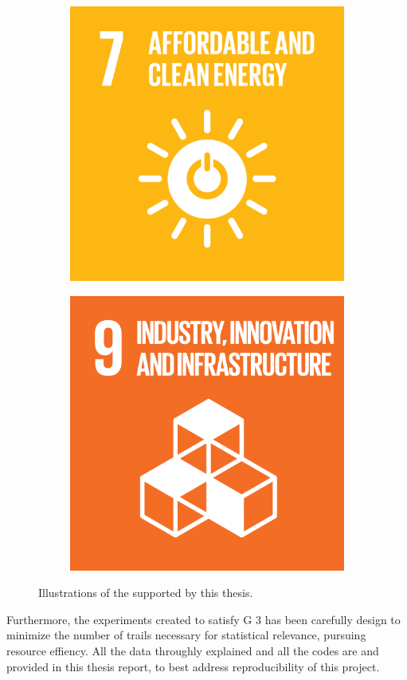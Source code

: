 \begin{figure}
    \centering
    \begin{subfigure}[b]{0.5\linewidth}
        \centering
        \includegraphics[width=0.6\linewidth]{figures/1-introduction/SDG_icons-07.png} 
        \label{fig:sdg07}
    \end{subfigure}\hfill
    \begin{subfigure}[b]{0.5\linewidth}
        \centering
        \includegraphics[width=0.6\linewidth]{figures/1-introduction/SDG_icons-09.png}
        \label{fig:sdg09}
	\end{subfigure}
	\caption[Sustainable Development Goals supported by this thesis]{Illustrations of the  supported by this thesis.}
	\label{fig:sdgs}
\end{figure}

Furthermore, the experiments created to satisfy \gls{G} 3 has been carefully design to minimize the number of trails necessary for statistical relevance, pursuing resource effiency. All the data throughly explained and all the codes are and provided in this thesis report, to best address reproducibility of this project.